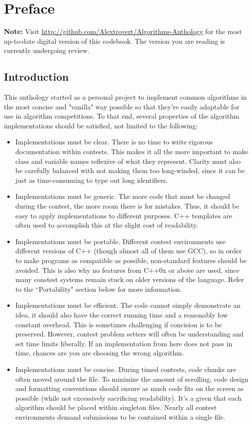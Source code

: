 \chapter{Preface}

\raggedright
\setlength{\parskip}{0.5em}

\textbf{Note:} Visit \url{http://github.com/Alextrovert/Algorithms-Anthology} for the most up-to-date digital version of this codebook. The version you are reading is currently undergoing review.

\section{Introduction}

This anthology started as a personal project to implement common algorithms in the most concise and "vanilla" way possible so that they're easily adaptable for use in algorithm competitions. To that end, several properties of the algorithm implementations should be satisfied, not limited to the following:
\begin{itemize}
	\item Implementations must be clear. There is no time to write rigorous documentation within contests. This makes it all the more important to make class and variable names reflexive of what they represent. Clarity must also be carefully balanced with not making them too long-winded, since it can be just as time-consuming to type out long identifiers.
	\item Implementations must be generic. The more code that must be changed during the contest, the more room there is for mistakes. Thus, it should be easy to apply implementations to different purposes. C++ templates are often used to accomplish this at the slight cost of readability.
	\item Implementations must be portable. Different contest environments use different versions of C++ (though almost all of them use GCC), so in order to make programs as compatible as possible, non-standard features should be avoided. This is also why no features from C++0x or above are used, since many constest systems remain stuck on older versions of the language. Refer to the ``Portability" section below for more information.
	\item Implementations must be efficient. The code cannot simply demonstrate an idea, it should also have the correct running time and a reasonably low constant overhead. This is sometimes challenging if concision is to be preserved. However, contest problem setters will often be understanding and set time limits liberally. If an implementation from here does not pass in time, chances are you are choosing the wrong algorithm.
	\item Implementations must be concise. During timed contests, code chunks are often moved around the file. To minimize the amount of scrolling, code design and formatting conventions should ensure as much code fits on the screen as possible (while not excessively sacrificing readability). It's a given that each algorithm should be placed within singleton files. Nearly all contest environments demand submissions to be contained within a single file.
\end{itemize}

